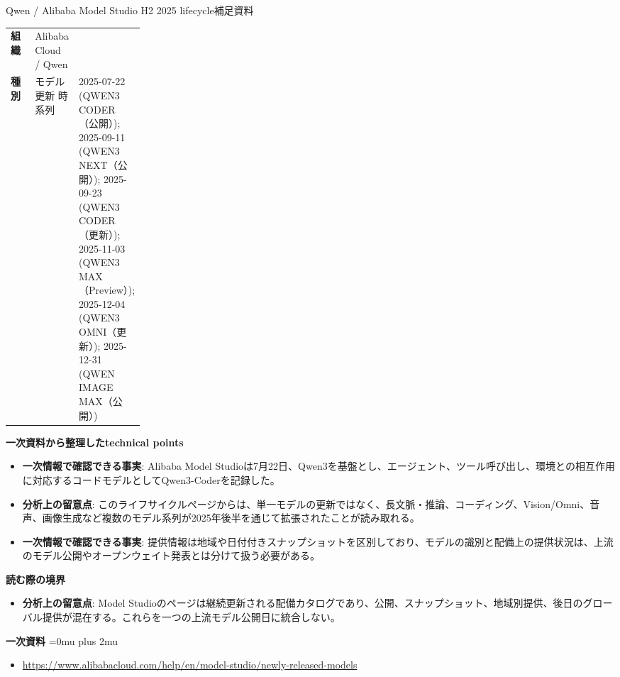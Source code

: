 \begin{technicalnote}{Qwen / Alibaba Model Studio H2 2025 lifecycle}{補足資料}
\begingroup
\begin{tabularx}{\linewidth}{@{}>{\bfseries}p{0.22\linewidth}X@{}}
組織 & Alibaba Cloud / Qwen \\
種別 & モデル更新
時系列 & 2025-07-22 (QWEN3 CODER（公開）); 2025-09-11 (QWEN3 NEXT（公開）); 2025-09-23 (QWEN3 CODER（更新）); 2025-11-03 (QWEN3 MAX（Preview）); 2025-12-04 (QWEN3 OMNI（更新）); 2025-12-31 (QWEN IMAGE MAX（公開）) \\
\end{tabularx}
\smallskip
{\bfseries 一次資料から整理したtechnical points}
\begin{itemize}[leftmargin=1.5em,itemsep=0.35em]
\item \textbf{一次情報で確認できる事実}: Alibaba Model Studioは7月22日、Qwen3を基盤とし、エージェント、ツール呼び出し、環境との相互作用に対応するコードモデルとしてQwen3-Coderを記録した。
\item \textbf{分析上の留意点}: このライフサイクルページからは、単一モデルの更新ではなく、長文脈・推論、コーディング、Vision/Omni、音声、画像生成など複数のモデル系列が2025年後半を通じて拡張されたことが読み取れる。
\item \textbf{一次情報で確認できる事実}: 提供情報は地域や日付付きスナップショットを区別しており、モデルの識別と配備上の提供状況は、上流のモデル公開やオープンウェイト発表とは分けて扱う必要がある。
\end{itemize}
\begin{minipage}{\linewidth}
{\bfseries 読む際の境界}
\begin{itemize}[leftmargin=1.5em,itemsep=0.35em]
\item \textbf{分析上の留意点}: Model Studioのページは継続更新される配備カタログであり、公開、スナップショット、地域別提供、後日のグローバル提供が混在する。これらを一つの上流モデル公開日に統合しない。
\end{itemize}
\begin{samepage}
{\bfseries 一次資料}
\begingroup\sloppy
\Urlmuskip=0mu plus 2mu\relax
\begin{itemize}[leftmargin=1.5em,itemsep=0.25em]
\item {\scriptsize\url{https://www.alibabacloud.com/help/en/model-studio/newly-released-models}}
\end{itemize}
\endgroup
\end{samepage}
\end{minipage}
\endgroup
\end{technicalnote}
\medskip

